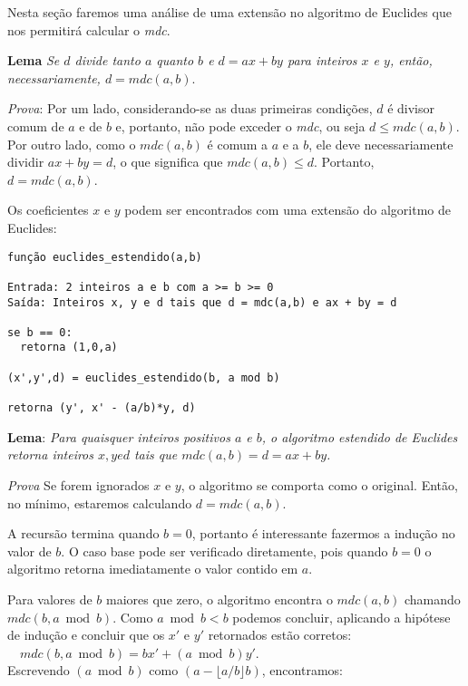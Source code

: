Nesta seção faremos uma análise de uma extensão no algoritmo de Euclides que
nos permitirá calcular o \textit{mdc}.

\textbf{Lema} \textit{Se $d$ divide tanto $a$ quanto $b$ e $d = ax + by$ para
inteiros $x$ e $y$, então, necessariamente, $d = mdc(a,b)$}.

\textit{Prova}: Por um lado, considerando-se as duas primeiras condições, $d$
é divisor comum de $a$ e de $b$ e, portanto, não pode exceder o \textit{mdc},
ou seja $d \leq mdc(a,b)$. Por outro lado, como o $mdc(a,b)$ é comum a $a$ e a
$b$, ele deve necessariamente dividir $ax + by = d$, o que significa que
$mdc(a,b) \leq d$. Portanto, $d = mdc(a,b)$.

Os coeficientes $x$ e $y$ podem ser encontrados com uma extensão do algoritmo
de Euclides:

\begin{verbatim}
função euclides_estendido(a,b)

Entrada: 2 inteiros a e b com a >= b >= 0
Saída: Inteiros x, y e d tais que d = mdc(a,b) e ax + by = d

se b == 0:
  retorna (1,0,a)

(x',y',d) = euclides_estendido(b, a mod b)

retorna (y', x' - (a/b)*y, d)

\end{verbatim}

\textbf{Lema}: \textit{Para quaisquer inteiros positivos $a$ e $b$, o
algoritmo estendido de Euclides retorna inteiros $x, y e d$ tais que $mdc(a,b)
= d = ax + by$.}

\textit{Prova} Se forem ignorados $x$ e $y$, o algoritmo se comporta como o
original. Então, no mínimo, estaremos calculando $d = mdc(a,b)$.

A recursão termina quando $b=0$, portanto é interessante fazermos a indução no
valor de $b$. O caso base pode ser verificado diretamente, pois quando $b = 0$
o algoritmo retorna imediatamente o valor contido em $a$.

Para valores de $b$ maiores que zero, o algoritmo encontra o $mdc(a,b)$
chamando $mdc(b, a \bmod b)$. Como $a \bmod b < b$ podemos concluir, aplicando
a hipótese de indução e concluir que os $x'$ e $y'$ retornados estão
corretos:\\

$\quad mdc(b, a\bmod b) = bx' + (a \bmod b)y'$.\\

Escrevendo $(a \bmod b)$ como $(a - \lfloor a/b \rfloor b)$, encontramos:\\

